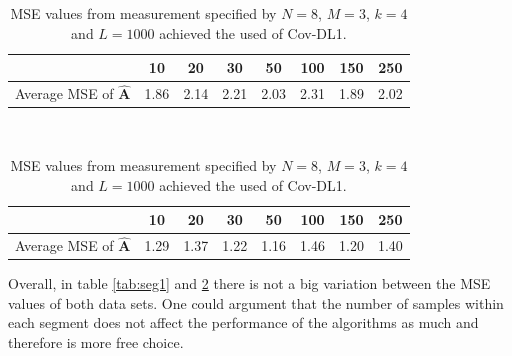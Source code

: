 \begin{table}[H]
\centering
\begin{minipage}{.45\textwidth}
\centering
\begin{tabular}{|c|c|c|c|c|c|c|c|}
\hline 
& 10 & 20 & 30 & 50 & 100 & 150 & 250 \\ 
\hline 
Average MSE of $\hat{\mathbf{A}}$ & 1.86 & 2.14 & 2.21 & 2.03 & 2.31 & 1.89 & 2.02 \\ 
\hline
\end{tabular} 
\caption{MSE values from measurement specified by $N=5$, $M = 3$, $k = 4$ and $L = 1000$ achieved from the used of Cov-DL2}
\label{tab:seg1}
\end{minipage}
\\
\begin{minipage}{.45\textwidth}
\centering
\begin{tabular}{|c|c|c|c|c|c|c|c|}
\hline 
& 10 & 20 & 30 & 50 & 100 & 150 & 250 \\ 
\hline 
Average MSE of $\hat{\mathbf{A}}$ & 1.29 & 1.37 & 1.22 & 1.16 & 1.46 & 1.20 & 1.40 \\ 
\hline
\end{tabular} 
\caption{MSE values from measurement specified by $N=8$, $M = 3$, $k = 4$ and $L = 1000$ achieved the used of Cov-DL1.}
\label{tab:seg2}
\end{minipage}
\end{table}
\noindent
Overall, in table \ref{tab:seg1} and \ref{tab:seg2} there is not a big variation between the MSE values of both data sets. One could argument that the number of samples within each segment does not affect the performance of the algorithms as much and therefore is more free choice.